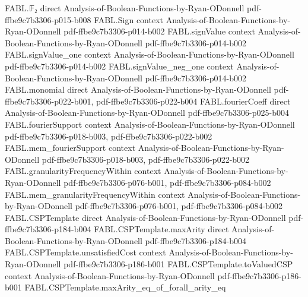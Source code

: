 \begin{theorem}
\label{FABL.expect_value_maxE3Sat}
\leanok
{}
\proofstep
  {FABL.𝔽₂}
  {direct}
  {Analysis-of-Boolean-Functions-by-Ryan-ODonnell}
  {pdf-ffbe9c7b3306-p015-b008}
\proofstep
  {FABL.Sign}
  {context}
  {Analysis-of-Boolean-Functions-by-Ryan-ODonnell}
  {pdf-ffbe9c7b3306-p014-b002}
\proofstep
  {FABL.signValue}
  {context}
  {Analysis-of-Boolean-Functions-by-Ryan-ODonnell}
  {pdf-ffbe9c7b3306-p014-b002}
\proofstep
  {FABL.signValue_one}
  {context}
  {Analysis-of-Boolean-Functions-by-Ryan-ODonnell}
  {pdf-ffbe9c7b3306-p014-b002}
\proofstep
  {FABL.signValue_neg_one}
  {context}
  {Analysis-of-Boolean-Functions-by-Ryan-ODonnell}
  {pdf-ffbe9c7b3306-p014-b002}
\proofstep
  {FABL.monomial}
  {direct}
  {Analysis-of-Boolean-Functions-by-Ryan-ODonnell}
  {pdf-ffbe9c7b3306-p022-b001,
    pdf-ffbe9c7b3306-p022-b004}
\proofstep
  {FABL.fourierCoeff}
  {direct}
  {Analysis-of-Boolean-Functions-by-Ryan-ODonnell}
  {pdf-ffbe9c7b3306-p025-b004}
\proofstep
  {FABL.fourierSupport}
  {context}
  {Analysis-of-Boolean-Functions-by-Ryan-ODonnell}
  {pdf-ffbe9c7b3306-p018-b003,
    pdf-ffbe9c7b3306-p022-b002}
\proofstep
  {FABL.mem_fourierSupport}
  {context}
  {Analysis-of-Boolean-Functions-by-Ryan-ODonnell}
  {pdf-ffbe9c7b3306-p018-b003,
    pdf-ffbe9c7b3306-p022-b002}
\proofstep
  {FABL.granularityFrequencyWithin}
  {context}
  {Analysis-of-Boolean-Functions-by-Ryan-ODonnell}
  {pdf-ffbe9c7b3306-p076-b001,
    pdf-ffbe9c7b3306-p084-b002}
\proofstep
  {FABL.mem_granularityFrequencyWithin}
  {context}
  {Analysis-of-Boolean-Functions-by-Ryan-ODonnell}
  {pdf-ffbe9c7b3306-p076-b001,
    pdf-ffbe9c7b3306-p084-b002}
\proofstep
  {FABL.CSPTemplate}
  {direct}
  {Analysis-of-Boolean-Functions-by-Ryan-ODonnell}
  {pdf-ffbe9c7b3306-p184-b004}
\proofstep
  {FABL.CSPTemplate.maxArity}
  {direct}
  {Analysis-of-Boolean-Functions-by-Ryan-ODonnell}
  {pdf-ffbe9c7b3306-p184-b004}
\proofstep
  {FABL.CSPTemplate.unsatisfiedCost}
  {context}
  {Analysis-of-Boolean-Functions-by-Ryan-ODonnell}
  {pdf-ffbe9c7b3306-p186-b001}
\proofstep
  {FABL.CSPTemplate.toValuedCSP}
  {context}
  {Analysis-of-Boolean-Functions-by-Ryan-ODonnell}
  {pdf-ffbe9c7b3306-p186-b001}
\proofstep
  {FABL.CSPTemplate.maxArity_eq_of_forall_arity_eq}

\end{theorem}
